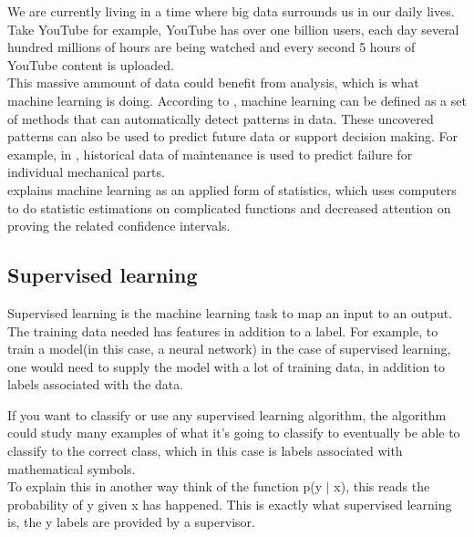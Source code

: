 We are currently living in a time where big data surrounds us in our daily lives. Take YouTube for example, YouTube has over one billion users, each day several hundred millions of hours are being watched and every second 5 hours of YouTube content is uploaded. \\ %
 This massive ammount of data could benefit from analysis, which is what machine learning is doing. According to \cite{murphy_machine_2012}, machine learning can be defined as a set of methods that can automatically detect patterns in data. These uncovered patterns can also be used to predict future data or support decision making. For example, in \cite{cline_predictive_2017}, historical data of maintenance is used to predict failure for individual mechanical parts. \\
\cite{goodfellow_deep_2016} explains machine learning as an applied form of statistics, which uses computers to do statistic estimations on complicated functions and decreased attention on proving the related confidence intervals. 


\subsection{Supervised learning}
% 

Supervised learning is the machine learning task to map an input to an output. The training data needed has features in addition to a label. For example, to train a model(in this case, a neural network) in the case of supervised learning, one would need to supply the model with a lot of training data, in addition to labels associated with the data. %

If you want to classify or use any supervised learning algorithm, the algorithm could study many examples of what it's going to classify to eventually be able to classify to the correct class, which in this case is labels associated with mathematical symbols.\\ To explain this in another way think of the function p(y $|$ x), this reads the probability of y given x has happened. This is exactly what supervised learning is, the y labels are provided by a supervisor.\\

